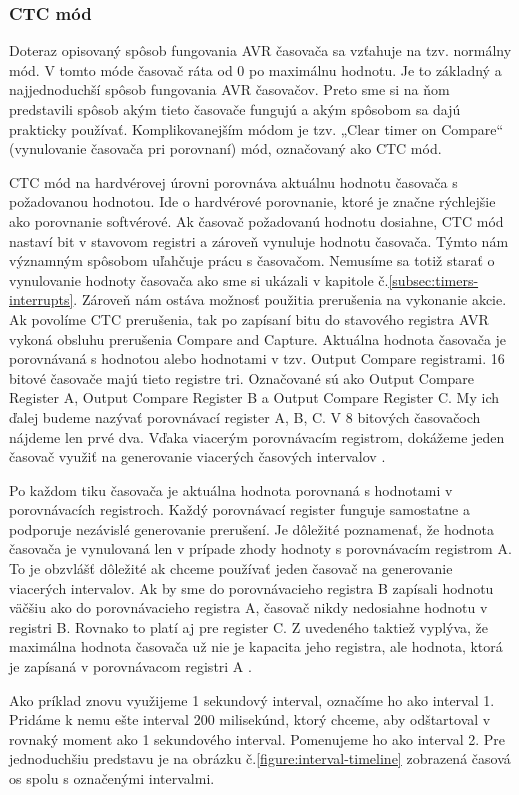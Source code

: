 \subsubsection{CTC mód} \label{subsec:ctc-mode}
\noindent \par
Doteraz opisovaný spôsob fungovania AVR časovača sa vzťahuje na tzv. normálny  mód. V tomto móde časovač ráta od 0 po maximálnu hodnotu.
Je to základný a najjednoduchší spôsob fungovania AVR časovačov. Preto sme si na ňom predstavili spôsob akým tieto časovače fungujú a akým spôsobom sa dajú prakticky
používať. Komplikovanejším módom je tzv. „Clear timer on Compare“ (vynulovanie časovača pri porovnaní) mód, označovaný ako CTC mód. \par
CTC mód na hardvérovej úrovni porovnáva aktuálnu hodnotu časovača s požadovanou hodnotou. Ide o hardvérové porovnanie, ktoré je značne rýchlejšie ako porovnanie
softvérové. Ak časovač požadovanú hodnotu dosiahne, CTC mód nastaví bit v stavovom registri
a zároveň vynuluje hodnotu časovača. Týmto nám významným spôsobom uľahčuje prácu s časovačom. Nemusíme sa totiž starať o vynulovanie hodnoty časovača ako sme si ukázali
v kapitole č.\ref{subsec:timers-interrupts}. Zároveň nám ostáva možnosť použitia prerušenia na vykonanie akcie. Ak povolíme CTC prerušenia, tak po zapísaní bitu
do stavového registra AVR vykoná obsluhu prerušenia Compare and Capture. Aktuálna hodnota časovača je porovnávaná s hodnotou alebo hodnotami v tzv. Output Compare registrami.
16 bitové časovače majú tieto registre tri. Označované sú ako Output Compare Register A, Output Compare Register B a Output Compare Register C. My ich ďalej budeme nazývať
porovnávací register A, B, C. V 8 bitových časovačoch nájdeme len prvé dva. Vďaka viacerým porovnávacím registrom, dokážeme jeden časovač využiť na generovanie viacerých
časových intervalov \cite{atmelATmega64012801281}. \par
Po každom tiku časovača je aktuálna hodnota  porovnaná s hodnotami v porovnávacích registroch. Každý porovnávací register funguje
samostatne a podporuje nezávislé generovanie prerušení. Je dôležité poznamenať, že hodnota časovača je vynulovaná len v prípade zhody hodnoty s porovnávacím registrom A.
To je obzvlášť dôležité ak chceme používať jeden časovač na generovanie viacerých intervalov. Ak by sme do porovnávacieho registra B zapísali hodnotu väčšiu ako
do porovnávacieho registra A, časovač nikdy nedosiahne hodnotu v registri B. Rovnako to platí aj pre register C. Z uvedeného taktiež vyplýva, že maximálna hodnota
časovača už nie je kapacita jeho registra, ale hodnota, ktorá je zapísaná v porovnávacom registri A \cite{atmelATmega64012801281}. \par
Ako príklad znovu využijeme 1 sekundový interval, označíme ho ako interval 1.
Pridáme k nemu ešte interval 200 milisekúnd, ktorý chceme, aby odštartoval v rovnaký moment ako 1 sekundového interval. Pomenujeme ho ako interval 2. Pre jednoduchšiu
predstavu je na obrázku č.\ref{figure:interval-timeline} zobrazená časová os spolu s označenými intervalmi.


